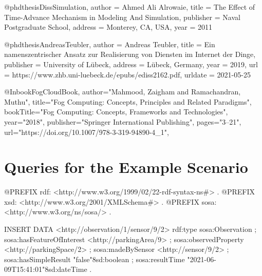 \documentclass[english,version-2019-11]{uzl-thesis}
\begin{document}
\begin{bibtex-entries}
@phdthesis{DissSimulation,
    author    = {Ahmed Ali Alrowaie},
    title     = {The Effect of Time-Advance Mechanism in Modeling And Simulation},
    publisher = {Naval Postgraduate School},
    address   = {Monterey, CA, USA},
    year      = {2011}
}

@phdthesis{AndreasTeubler,
    author    = {Andreas Teubler},
    title     = {Ein namenszentrischer Ansatz zur Realisierung von Diensten im Internet der Dinge},
    publisher = {University of L{\"u}beck},
    address   = {L{\"u}beck, Germany},
    year      = {2019},
    url       = {https://www.zhb.uni-luebeck.de/epubs/ediss2162.pdf},
    urldate   = {2021-05-25}
}


@Inbook{FogCloudBook,
    author="Mahmood, Zaigham
    and Ramachandran, Muthu",
    title="Fog Computing: Concepts, Principles and Related Paradigms",
    bookTitle="Fog Computing: Concepts, Frameworks and Technologies",
    year="2018",
    publisher="Springer International Publishing",
    pages="3--21",
    url="https://doi.org/10.1007/978-3-319-94890-4_1",
}


\end{bibtex-entries}

%
%
%
%

\appendix
\chapter{Queries for the Example Scenario}
\label{appendix_queries}

\begin{SPARQL}[caption={The samples are added with the $insert\; data$ operation.},
  float, label=appendix_query_insert, morekeywords={@prefix, insert, data}, captionpos=b]
@PREFIX rdf: <http://www.w3.org/1999/02/22-rdf-syntax-ns#> .
@PREFIX xsd: <http://www.w3.org/2001/XMLSchema#> .
@PREFIX sosa: <http://www.w3.org/ns/sosa/> .

INSERT DATA {
    <http://observation/1/sensor/9/2> rdf:type sosa:Observation ;
    sosa:hasFeatureOfInterest <http://parkingArea/9> ;
    sosa:observedProperty <http://parkingSpace/2> ;
    sosa:madeBySensor <http://sensor/9/2> ;
    sosa:hasSimpleResult "false"^^xsd:boolean ;
    sosa:resultTime "2021-06-09T15:41:01"^^xsd:dateTime .
}
\end{SPARQL}
\end{document}
